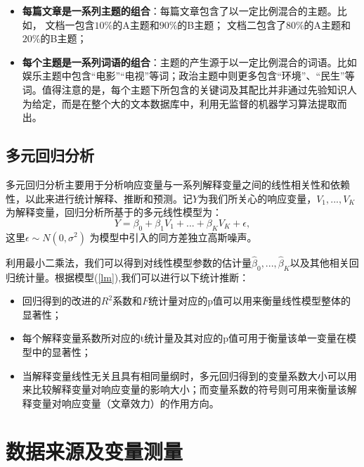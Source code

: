\documentclass[a4paper,12pt]{article}
\begin{document}
    \begin{itemize}
      \item \textbf{每篇文章是一系列主题的组合}：每篇文章包含了以一定比例混合的主题。比如， 文档一包含$10\%$的A主题和$90\%$的B主题； 文档二包含了$80\%$的A主题和$20\%$的B主题；
      \item \textbf{每个主题是一系列词语的组合}：主题的产生源于以一定比例混合的词语。比如
      娱乐主题中包含“电影”“电视”等词；政治主题中则更多包含“环境”、“民生”等词。值得注意的是，每个主题下所包含的关键词及其配比并非通过先验知识人为给定，而是在整个大的文本数据库中，利用无监督的机器学习算法提取而出。
    \end{itemize}
    
    \subsection{多元回归分析}
    多元回归分析主要用于分析响应变量与一系列解释变量之间的线性相关性和依赖性，以此来进行统计解释、推断和预测。记$Y$为我们所关心的响应变量，$V_1,...,V_K$为解释变量，回归分析所基于的多元线性模型为：
    \begin{equation}\label{lm}
      Y = \beta_0+ \beta_1 V_1+...+\beta_K V_K +\epsilon,
    \end{equation}
    这里$\epsilon \sim N(0,\sigma^2)$ 为模型中引入的同方差独立高斯噪声。
    
    利用最小二乘法，我们可以得到对线性模型参数的估计量$\hat\beta_0,...,\hat\beta_K$以及其他相关回归统计量。根据模型(\ref{lm}),我们可以进行以下统计推断：
    \begin{itemize}
      \item 回归得到的改进的$R^2$系数和$F$统计量对应的p值可以用来衡量线性模型整体的显著性；
      \item 每个解释变量系数所对应的t统计量及其对应的p值可用于衡量该单一变量在模型中的显著性；
      \item 当解释变量线性无关且具有相同量纲时，多元回归得到的变量系数大小可以用来比较解释变量对响应变量的影响大小；而变量系数的符号则可用来衡量该解释变量对响应变量（文章效力）的作用方向。
    \end{itemize}
    \section{数据来源及变量测量}
\end{document}
